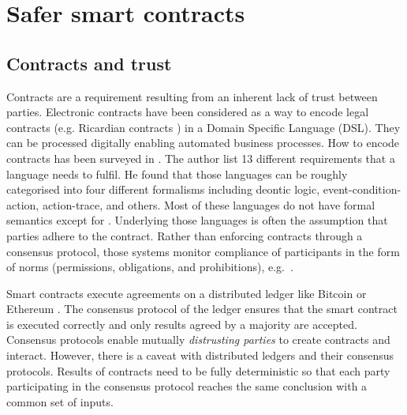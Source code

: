 \documentclass{llncs}
\begin{document}
\section{Safer smart contracts}
\label{background}




\subsection{Contracts and trust}

Contracts are a requirement resulting from an inherent lack of trust between parties.
Electronic contracts have been considered as a way to encode legal contracts (e.g. Ricardian contracts \cite{Grigg2004}) in a Domain Specific Language (DSL). 
They can be processed digitally enabling automated business processes.
How to encode contracts has been surveyed in \cite{Hvitved2010}. 
The author list 13 different requirements that a language needs to fulfil.
He found that those languages can be roughly categorised into four different formalisms including deontic logic, event-condition-action, action-trace, and others.
Most of these languages do not have formal semantics except for \cite{Andersen2006,Kyas2008,Xu2004}.
Underlying those languages is often the assumption that parties adhere to the contract.
Rather than enforcing contracts through a consensus protocol, those systems monitor compliance of participants in the form of norms (permissions, obligations, and prohibitions), e.g.\ \cite{Kyas2008}.

Smart contracts execute agreements on a distributed ledger like Bitcoin or Ethereum \cite{Nakamoto2008,Buterin2013}.
The consensus protocol of the ledger ensures that the smart contract is executed correctly and only results agreed by a majority are accepted.
Consensus protocols enable mutually \emph{distrusting parties} to create contracts and interact.
However, there is a caveat with distributed ledgers and their consensus protocols.
Results of contracts need to be fully deterministic so that each party participating in the consensus protocol reaches the same conclusion with a common set of inputs.
\end{document}
